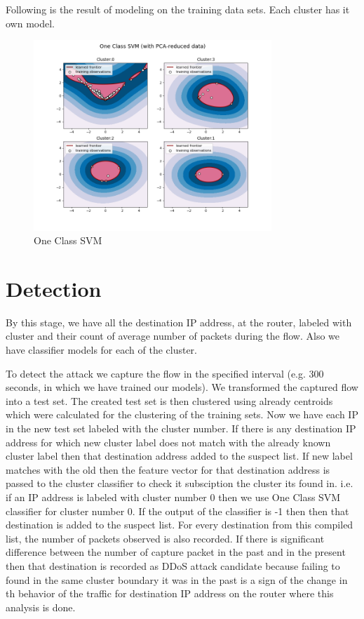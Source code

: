 \documentclass[10pt,oneside,a4paper]{article}
\begin{document}
Following is the result of modeling on the training data sets. Each cluster has it own model.

\begin{figure}[H]
\centering
\includegraphics[width=0.80\textwidth]{one-class-SVM.png}
\caption{One Class SVM} \label{fig:one-class-SVM}
\end{figure}


\section{Detection}

By this stage, we have all the destination IP address, at the router, labeled with cluster and their count of average number of packets during the flow. Also we have classifier models for each of the cluster.

To detect the attack we capture the flow in the specified interval (e.g. 300 seconds, in which we have trained our models). We transformed the captured flow into a test set. The created test set is then clustered using already centroids which were calculated for the clustering of the training sets. Now we have each IP in the new test set labeled with the cluster number. If there is any destination IP address for which new cluster label does not match with the already known cluster label then that destination address added to the suspect list. If new label matches with the old then the feature vector for that destination address is passed to the cluster classifier to check it subsciption the cluster its found in. i.e. if an IP address is labeled with cluster number 0 then we use One Class SVM classifier for cluster number 0. If the output of the classifier is -1 then then that destination is added to the suspect list. For every destination from this compiled list, the number of packets observed is also recorded. If there is significant difference between the number of capture packet in the past and in the present then that destination is recorded as DDoS attack candidate because failing to found in the same cluster boundary it was in the past is a sign of the change in th behavior of the traffic for destination IP address on the router where this analysis is done.
\end{document}
